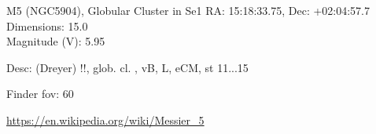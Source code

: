 \begin{block}{M5 (NGC5904), Globular Cluster in Se1}
    RA: 15:18:33.75, Dec: +02:04:57.7 \\ 
    Dimensions: 15.0 \\ 
    Magnitude (V): 5.95


    Desc: (Dreyer) !!, glob. cl. , vB, L, eCM, st 11...15 

    Finder fov: 60 

    \url{https://en.wikipedia.org/wiki/Messier_5} 
\end{block}